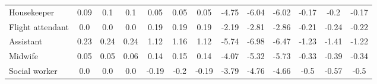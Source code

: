 \begin{table}[t]
{\begin{tabular}{l|ccc|ccc|ccc|ccc}
Housekeeper
& \cellcolor{green1} 0.09 & \cellcolor{green1} 0.1 & \cellcolor{green1} 0.1
&\cellcolor{green1} 0.05 & \cellcolor{green1} 0.05 & \cellcolor{green1} 0.05
&\cellcolor{red3} -4.75 & \cellcolor{red4} -6.04 & \cellcolor{red4} -6.02
&\cellcolor{red1} -0.17 & \cellcolor{red1} -0.2 & \cellcolor{red1} -0.17
\\
Flight attendant
& \cellcolor{green1} 0.0 & \cellcolor{green1} 0.0 & \cellcolor{green1} 0.0
&\cellcolor{green1} 0.19 & \cellcolor{green1} 0.19 & \cellcolor{green1} 0.19
&\cellcolor{red2} -2.19 & \cellcolor{red2} -2.81 & \cellcolor{red2} -2.86
&\cellcolor{red1} -0.21 & \cellcolor{red1} -0.24 & \cellcolor{red1} -0.22
\\
Assistant
& \cellcolor{green1} 0.23 & \cellcolor{green1} 0.24 & \cellcolor{green1} 0.24
&\cellcolor{green1} 1.12 & \cellcolor{green1} 1.16 & \cellcolor{green1} 1.12
&\cellcolor{red3} -5.74 & \cellcolor{red4} -6.98 & \cellcolor{red4} -6.47
&\cellcolor{red1} -1.23 & \cellcolor{red1} -1.41 & \cellcolor{red1} -1.22
\\
Midwife
& \cellcolor{green1} 0.05 & \cellcolor{green1} 0.05 & \cellcolor{green1} 0.06
&\cellcolor{green1} 0.14 & \cellcolor{green1} 0.15 & \cellcolor{green1} 0.14
&\cellcolor{red3} -4.07 & \cellcolor{red3} -5.32 & \cellcolor{red3} -5.73
&\cellcolor{red1} -0.33 & \cellcolor{red1} -0.39 & \cellcolor{red1} -0.34
\\
Social worker
& \cellcolor{green1} 0.0 & \cellcolor{green1} 0.0 & \cellcolor{green1} 0.0
&\cellcolor{red1} -0.19 & \cellcolor{red1} -0.2 & \cellcolor{red1} -0.19
&\cellcolor{red2} -3.79 & \cellcolor{red3} -4.76 & \cellcolor{red3} -4.66
&\cellcolor{red1} -0.5 & \cellcolor{red1} -0.57 & \cellcolor{red1} -0.5
\\


\bottomrule
\end{tabular}
}
\label{table:results-bias-mitigation}
\end{table}